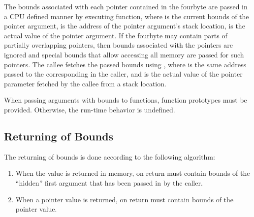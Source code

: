 The bounds associated with each pointer contained in the fourbyte are
passed in a CPU defined manner by executing
 function, where  is the
current bounds of the pointer argument,  is the address of the
pointer argument's stack location,  is the actual value of the
pointer argument.  If the fourbyte may contain parts of partially
overlapping pointers, then bounds associated with the pointers are ignored
and special bounds that allow accessing all memory are passed for such
pointers.  The callee fetches the passed bounds using
, where  is the same address
passed to the corresponding  in the caller, and
 is the actual value of the pointer parameter fetched by the
callee from a stack location.

When passing arguments with bounds to functions, function prototypes
must be provided.  Otherwise, the run-time behavior is undefined.

\subsection{Returning of Bounds}
The returning of bounds is done according to the following algorithm:
\begin{enumerate}
\item When the value is returned in memory, on return  must
  contain bounds of the ``hidden'' first argument that has been passed
  in by the caller.

\item When a pointer value is returned, on return  must
  contain bounds of the pointer value.
\end{enumerate}

